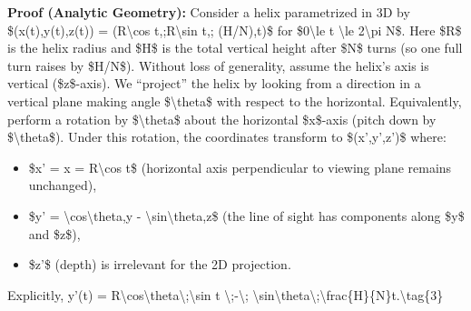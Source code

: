 \documentclass[]{article}
\begin{document}
\textbf{Proof (Analytic Geometry):} Consider a helix parametrized in 3D
by \$(x(t),y(t),z(t)) = (R\textbackslash{}cos t,;R\textbackslash{}sin
t,; (H/N),t)\$ for \$0\textbackslash{}le t \textbackslash{}le
2\textbackslash{}pi N\$. Here \$R\$ is the helix radius and \$H\$ is the
total vertical height after \$N\$ turns (so one full turn raises by
\$H/N\$). Without loss of generality, assume the helix's axis is
vertical (\$z\$-axis). We ``project'' the helix by looking from a
direction in a vertical plane making angle \$\textbackslash{}theta\$
with respect to the horizontal. Equivalently, perform a rotation by
\$\textbackslash{}theta\$ about the horizontal \$x\$-axis (pitch down by
\$\textbackslash{}theta\$). Under this rotation, the coordinates
transform to \$(x',y',z')\$ where:

\begin{itemize}
\item
  \$x' = x = R\textbackslash{}cos t\$ (horizontal axis perpendicular to
  viewing plane remains unchanged),
\item
  \$y' = \textbackslash{}cos\textbackslash{}theta,y -
  \textbackslash{}sin\textbackslash{}theta,z\$ (the line of sight has
  components along \$y\$ and \$z\$),
\item
  \$z'\$ (depth) is irrelevant for the 2D projection.
\end{itemize}

Explicitly, y'(t) =
R\textbackslash{}cos\textbackslash{}theta\textbackslash{};\textbackslash{}sin
t \textbackslash{};-\textbackslash{};
\textbackslash{}sin\textbackslash{}theta\textbackslash{};\textbackslash{}frac\{H\}\{N\}t.\textbackslash{}tag\{3\}
\end{document}
